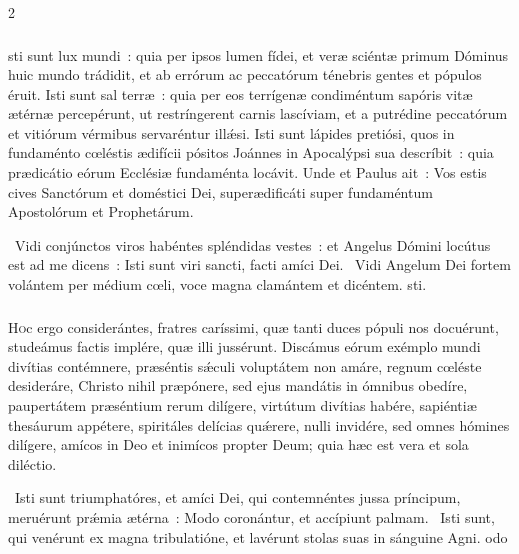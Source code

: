 \documentclass[9pt,twoside]{extarticle}
\begin{document}
\begin{multicols}{2}
{\subsubsection*{\center {}}
sti sunt lux mundi~: quia per ipsos lumen fídei, et veræ sciéntæ primum Dóminus huic mundo trádidit, et ab errórum ac peccatórum ténebris gentes et pópulos éruit. Isti sunt sal terræ~: quia per eos terrígenæ condiméntum sapóris vitæ ætérnæ percepérunt, ut restríngerent carnis lascíviam, et a putrédine peccatórum et vitiórum vérmibus servaréntur illǽsi. Isti sunt lápides pretiósi, quos in fundaménto cœléstis ædifícii pósitos Joánnes in Apocalýpsi sua descríbit~: quia prædicátio eórum Ecclésiæ fundaménta locávit. Unde et Paulus ait~: Vos estis cives Sanctórum et doméstici Dei, superædificáti super fundaméntum Apostolórum et Prophetárum.

\begin{tightlist}{}
\item {}~Vidi conjúnctos viros habéntes spléndidas vestes~: et Angelus Dómini locútus est ad me dicens~: \textred{*} Isti sunt viri sancti, facti amíci Dei.
~Vidi Angelum Dei fortem volántem per médium cœli, voce magna clamántem et dicéntem. sti.
\end{tightlist}

\subsubsection*{\center {}}
\lettrine{H}oc ergo considerántes, fratres caríssimi, quæ tanti duces pópuli nos docuérunt, studeámus factis implére, quæ illi jussérunt. Discámus eórum exémplo mundi divítias contémnere, præséntis sǽculi voluptátem non amáre, regnum cœléste desideráre, Christo nihil præpónere, sed ejus mandátis in ómnibus obedíre, paupertátem præséntium rerum dilígere, virtútum divítias habére, sapiéntiæ thesáurum appétere, spiritáles delícias quǽrere, nulli invidére, sed omnes hómines dilígere, amícos in Deo et inimícos propter Deum; quia hæc est vera et sola diléctio.

\begin{tightlist}{}
\item {}~Isti sunt triumphatóres, et amíci Dei, qui contemnéntes jussa príncipum, meruérunt prǽmia ætérna~: \textred{*} Modo coronántur, et accípiunt palmam.
~Isti sunt, qui venérunt ex magna tribulatióne, et lavérunt stolas suas in sánguine Agni. odo
\end{tightlist}

}
\end{multicols}
\end{document}
